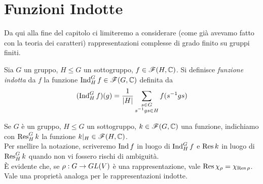 \section{Funzioni Indotte}
Da qui alla fine del capitolo ci limiteremo a considerare (come già avevamo fatto con la teoria dei caratteri) rappresentazioni complesse di grado finito su gruppi finiti.

\begin{definition}
Sia $G$ un gruppo, $H\le G$ un sottogruppo, $f\in\mathscr{F}(H,\mathbb{C})$. Si definisce \emph{funzione indotta} da $f$ la funzione $\operatorname{Ind}_H^Gf\in\mathscr{F}(G,\mathbb{C})$ definita da
$$
(\operatorname{Ind}_H^Gf)(g)=\frac{1}{|H|}\sum_{\substack{s\in G\\s^{-1}gs\in H}}f(s^{-1}gs)
$$
\end{definition}

Se $G$ è un gruppo, $H\le G$ un sottogruppo, $k\in\mathscr{F}(G,\mathbb{C})$ una funzione, indichiamo con $\operatorname{Res}_H^Gk$ la funzione $k|_H\in\mathscr{F}(H,\mathbb{C})$.\\
Per snellire la notazione, scriveremo $\operatorname{Ind} f$ in luogo di $\operatorname{Ind}_H^G f$ e $\operatorname{Res} k$ in luogo di $\operatorname{Res}_H^G k$ quando non vi fossero rischi di ambiguità.\\
È evidente che, se $\rho:G\to GL(V)$ è una rappresentazione, vale $\operatorname{Res}\chi_\rho=\chi_{\operatorname{Res}\rho}$. Vale una proprietà analoga per le rappresentazioni indotte.

